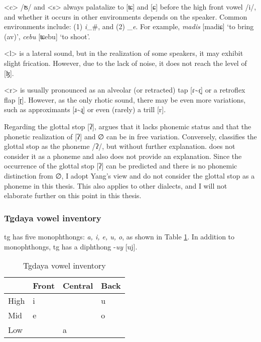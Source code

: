 <c> /ʦ/ and <s> always palatalize to [ʨ] and [ɕ] before the high front vowel /i/, and whether it occurs in other environments depends on the speaker. Common environments include: (1) \textit{i}\_\#, and (2) \_\textit{e}. For example, \textit{madis} [madiɕ] `to bring (\acs{av})', \textit{cebu} [ʨebu] `to shoot'. 

<l> is a lateral sound, but in the realization of some speakers, it may exhibit slight frication. However, due to the lack of noise, it does not reach the level of [ɮ].

<r> is usually pronounced as an alveolar (or retracted) tap [ɾ\~{}ɾ̠] or a retroflex flap [ɽ]. However, as the only rhotic sound, there may be even more variations, such as approximants [ɹ\~{}ɻ] or even (rarely) a trill [r].

Regarding the glottal stop [ʔ], \textcite{yang1976sedpho} argues that it lacks phonemic status and that the phonetic realization of [ʔ] and ∅ can be in free variation. Conversely, \textcite{holmer1996parametric} classifies the glottal stop as the phoneme /ʔ/, but without further explanation. \textcite{Sung2018Sedgrammar} does not consider it as a phoneme and also does not provide an explanation. Since the occurrence of the glottal stop [ʔ] can be predicted and there is no phonemic distinction from ∅, I adopt Yang's view and do not consider the glottal stop as a phoneme in this thesis. This also applies to other dialects, and I will not elaborate further on this point in this thesis.

\subsubsection{Tgdaya vowel inventory}

\acl{tg} has five monophthongs: \textit{a, i, e, u, o}, as shown in Table \ref{tab:tgV}. In addition to monophthongs, \acl{tg} has a diphthong -\textit{uy} [uj]. 

\begin{table}[!htbp]
\centering
\caption{Tgdaya vowel inventory}
\label{tab:tgV}
\begin{tabular}{llll}
\hline
     & Front & Central & Back \\ \hline
High &  i    &         &  u   \\
Mid  &  e    &         &  o   \\
Low  &       &  a      &      \\ \hline
\end{tabular}
\end{table}

